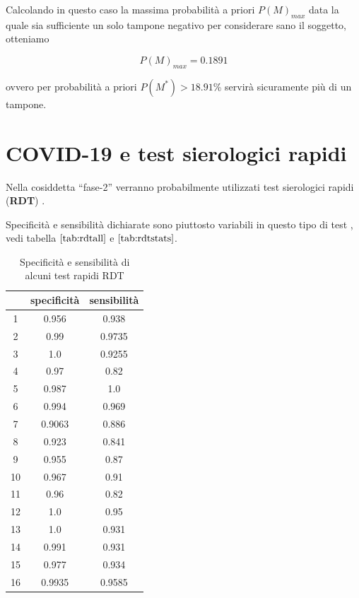\documentclass[11pt]{article}
\begin{document}
    
    Calcolando in questo caso la massima probabilità a priori \(P(M)_{max}\)
data la quale sia sufficiente un solo tampone negativo per considerare
sano il soggetto, otteniamo

    \[P(M)_{max} = 0.1891\]

ovvero per probabilità a priori \(P(M^*)>18.91%
\)\% servirà sicuramente più di un tampone.

    
    \hypertarget{covid-19-e-test-sierologici-rapidi}{%
\section{COVID-19 e test sierologici
rapidi}\label{covid-19-e-test-sierologici-rapidi}}

    Nella cosiddetta ``fase-2'' verranno probabilmente utilizzati test
sierologici rapidi (\textbf{RDT}) \cite{rdtdiagram}.

Specificità e sensibilità dichiarate sono piuttosto variabili in questo
tipo di test \cite{rdt}, vedi tabella \(\ref{tab:rdtall}\) e
\(\ref{tab:rdtstats}\).

    
\begin{table}
  \begin{center}
    \caption{Specificità e sensibilità di alcuni test rapidi RDT}
    \label{tab:rdtall}
    \begin{tabular}{c|c|c|}
        & specificità & sensibilità \\
        \toprule
        1 & 0.956 & 0.938\\ \midrule 2 & 0.99 & 0.9735\\ \midrule 3 & 1.0 & 0.9255\\ \midrule 4 & 0.97 & 0.82\\ \midrule 5 & 0.987 & 1.0\\ \midrule 6 & 0.994 & 0.969\\ \midrule 7 & 0.9063 & 0.886\\ \midrule 8 & 0.923 & 0.841\\ \midrule 9 & 0.955 & 0.87\\ \midrule 10 & 0.967 & 0.91\\ \midrule 11 & 0.96 & 0.82\\ \midrule 12 & 1.0 & 0.95\\ \midrule 13 & 1.0 & 0.931\\ \midrule 14 & 0.991 & 0.931\\ \midrule 15 & 0.977 & 0.934\\ \midrule 16 & 0.9935 & 0.9585
    \end{tabular}
  \end{center}
\end{table}
        
\end{document}
